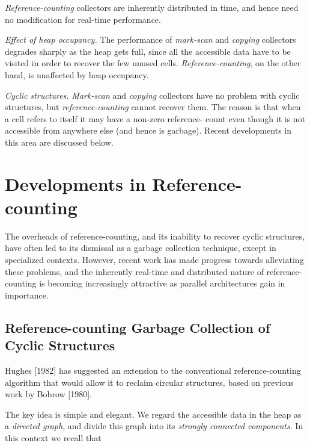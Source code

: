\begin{numbered}
    \textit{Reference-counting} collectors are inherently distributed in time, and
    hence need no modification for real-time performance.

    \item \textit{Effect of heap occupancy.} The performance of \textit{mark-scan} and \textit{copying}
    collectors degrades sharply as the heap gets full, since all the accessible
    data have to be visited in order to recover the few unused cells.
    \textit{Reference-counting}, on the other hand, is unaffected by heap occupancy.

    \item \textit{Cyclic structures.} \textit{Mark-scan} and \textit{copying} collectors have no problem
    with cyclic structures, but \textit{reference-counting} cannot recover them. The
    reason is that when a cell refers to itself it may have a non-zero reference-
        count even though it is not accessible from anywhere else (and hence is
    garbage). Recent developments in this area are discussed below.
    \end{numbered}

    \section{Developments in Reference-counting}

    The overheads of reference-counting, and its inability to recover cyclic
    structures, have often led to its dismissal as a garbage collection technique,
    except in specialized contexts. However, recent work has made progress
    towards alleviating these problems, and the inherently real-time and distributed nature of reference-counting is becoming increasingly attractive as
    parallel architectures gain in importance.

    \subsection{Reference-counting Garbage Collection of Cyclic Structures}

    Hughes [1982] has suggested an extension to the conventional reference-counting algorithm that would allow it to reclaim circular structures, based on
    previous work by Bobrow [1980].

    The key idea is simple and elegant. We regard the accessible data in the
    heap as a \textit{directed graph}, and divide this graph into its \textit{strongly connected
    components}. In this context we recall that


